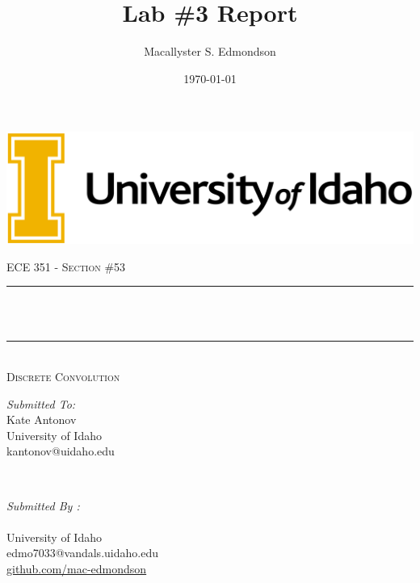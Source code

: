 \documentclass[12pt]{report}
\title{Lab \#3 Report}
\author{Macallyster S. Edmondson}
\date{\today}
\makeatletter
\let\thetitle\@title
\let\theauthor\@author
\makeatother
\begin{document}
\begin{titlepage}\thispagestyle{titlepage}
\centering
\includegraphics[scale = 0.12]{univ-logo.png}\\[1.0 cm]
\begin{center}    \textsc{\Large   ECE 351 - Section \#53 }\\[2.0 cm]
\end{center}%

\rule{\linewidth}{0.2 mm} \\[0.4 cm]
{ \huge \bfseries \thetitle}\\
\rule{\linewidth}{0.2 mm} \\[0.5 cm]
\textsc{\Large Discrete Convolution }\\[1.5 cm] %
\begin{minipage}{0.4\textwidth}
\begin{flushleft} \large
\emph{Submitted To:}\\
Kate Antonov\\ \small
University of Idaho\\
kantonov@uidaho.edu\\
\hfill
\end{flushleft}
\end{minipage}~
\begin{minipage}{0.4\textwidth}
\begin{flushright} \large
\emph{Submitted By :} \\
\theauthor \\ \small
University of Idaho\\
edmo7033@vandals.uidaho.edu\\
\href{http://github.com/mac-edmondson}{github.com/mac-edmondson}\\
\end{flushright}
\end{minipage}\\[2 cm]
\vfill
\end{titlepage}
\tableofcontents\thispagestyle{customplain}
\pagebreak
\renewcommand{\thesection}{\arabic{section}}
\end{document}
